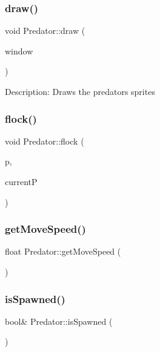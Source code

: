 \subsubsection{\texorpdfstring{draw()}{draw()}}
{\footnotesize\ttfamily void Predator\+::draw (\begin{DoxyParamCaption}\item[{sf\+::\+Render\+Window \&}]{window }\end{DoxyParamCaption})}

Description\+: Draws the predators sprites \mbox{\label{class_predator_a5445765daaf7807765d8082eb94b01d8}} 
\subsubsection{\texorpdfstring{flock()}{flock()}}
{\footnotesize\ttfamily void Predator\+::flock (\begin{DoxyParamCaption}\item[{std\+::vector$<$ \mbox{\hyperlink{class_predator}{Predator}} $>$ $\ast$}]{p,  }\item[{int}]{currentP }\end{DoxyParamCaption})}

\mbox{\label{class_predator_a2b71c74871cc39b38b1d668879ff1f6e}} 
\subsubsection{\texorpdfstring{getMoveSpeed()}{getMoveSpeed()}}
{\footnotesize\ttfamily float Predator\+::get\+Move\+Speed (\begin{DoxyParamCaption}{ }\end{DoxyParamCaption})\hspace{0.3cm}{\ttfamily [inline]}}

\mbox{\label{class_predator_a01db6f18bc0047f66202b29597a77917}} 
\subsubsection{\texorpdfstring{isSpawned()}{isSpawned()}}
{\footnotesize\ttfamily bool\& Predator\+::is\+Spawned (\begin{DoxyParamCaption}{ }\end{DoxyParamCaption})\hspace{0.3cm}{\ttfamily [inline]}}

